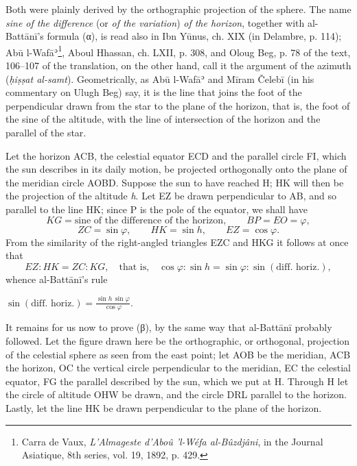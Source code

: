 \documentclass[11pt]{article}
\newcommand{\Pg}[1]{\marginpar{\footnotesize\color{gray}#1}}
\begin{document}
\par Both were plainly derived by the orthographic projection of the sphere. The name \emph{sine of the difference} (or \emph{of the variation}) \emph{of the horizon}, together with al-Battānī's formula ({\greekfont α}), is read also in Ibn Yūnus, ch. XIX (in Delambre, p. 114); Abū l-Wafāʾ\footnote{Carra de Vaux, \emph{L’Almageste d’Aboû ’l-Wéfa al-Bûzdjâni}, in the Journal Asiatique, 8th series, vol. 19, 1892, p. 429.}, Aboul Hhassan, ch. LXII, p. 308, and Oloug Beg, p. 78 of the text, 106–107 of the translation, on the other hand, call it the argument of the azimuth (\emph{ḥiṣṣat al-samt}). Geometrically, as Abū l-Wafāʾ and Mīram Čelebī (in his commentary on Ulugh Beg) say, it is the line that joins the foot of the perpendicular drawn from the star to the plane of the horizon, that is, the foot of the sine of the altitude, with the line of intersection of the horizon and the parallel of the star.\par
\begin{center}\end{center}
\par Let the horizon ACB, the celestial equator ECD and the parallel circle FI, which the sun describes in its daily motion, be projected orthogonally onto the plane of the meridian circle AOBD. Suppose the sun to have reached H; HK will then be the projection of the altitude \emph{h}. Let EZ be drawn perpendicular to AB, and so parallel to the line HK; since P is the pole of the equator, we shall have \[ KG = \text{sine of the difference of the horizon}, \qquad BP = EO = \varphi, \] \[ ZC = \sin\varphi, \qquad HK = \sin h, \qquad EZ = \cos\varphi. \] From the similarity of the right-angled triangles EZC and HKG it follows at once that \[ EZ : HK = ZC : KG, \quad\text{that is,}\quad \cos\varphi : \sin h = \sin\varphi : \sin(\text{diff. horiz.}), \] whence al-Battānī's rule \par\noindent\hspace*{1.5em}$\displaystyle \sin(\text{diff. horiz.}) = \frac{\sin h\,\sin\varphi}{\cos\varphi}.$\par\par
\begin{center}\end{center}
\par \Pg{I 184}It remains for us now to prove ({\greekfont β}), by the same way that al-Battānī probably followed. Let the figure drawn here be the orthographic, or orthogonal, projection of the celestial sphere as seen from the east point; let AOB be the meridian, ACB the horizon, OC the vertical circle perpendicular to the meridian, EC the celestial equator, FG the parallel described by the sun, which we put at H. Through H let the circle of altitude OHW be drawn, and the circle DRL parallel to the horizon. Lastly, let the line HK be drawn perpendicular to the plane of the horizon.\par
\end{document}
